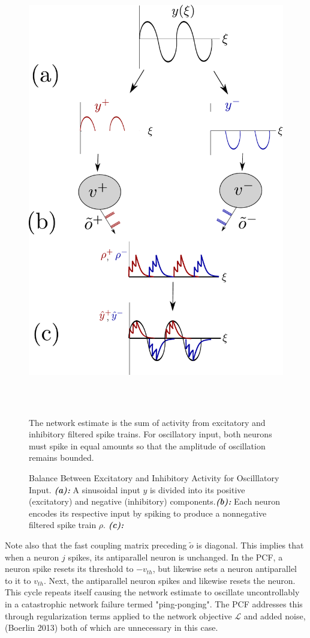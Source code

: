 \begin{enumerate}
\begin{figure}
\includegraphics[width=\linewidth, height=19cm]{figures/demo_balance_ei}
\caption{Balance Between Excitatory and Inhibitory Activity for Oscilllatory Input. \textbf{\textit{(a):}} A sinusoidal input $y$ is divided into its positive (excitatory) and negative (inhibitory) components.\textbf{\textit{(b):}} Each neuron encodes its respective input by spiking to produce a nonnegative filtered spike train $\rho$. \textbf{\textit{(c):}} } The network estimate is the sum of activity from excitatory and inhibitory filtered spike trains. For oscillatory input, both neurons must spike in equal amounts so that the amplitude of oscillation remains bounded. 
\label{fig:ei_balance_demo}
\end{figure}


Note also that the fast coupling matrix preceding $\tilde{o}$ is diagonal. This implies that when a neuron $j$ spikes, its antiparallel neuron is unchanged. In the PCF, a neuron spike resets its threshold to $-v_{th}$, but likewise sets a neuron antiparallel to it to $v_{th}$. Next, the antiparallel neuron spikes and likewise resets the neuron. This cycle repeats itself causing the network estimate to oscillate uncontrollably in a catastrophic network failure termed "ping-ponging". The PCF addresses this through regularization terms applied to the network objective $\mathcal{L}$ and added noise,  (Boerlin 2013) both of which are unnecessary in this case. 
\end{enumerate}

